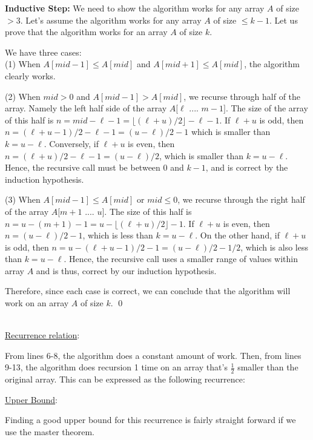 \documentclass[11pt]{article}
\begin{document}
\begin{enumerate}
{\bf Inductive Step:} We need to show the algorithm works for any array $A$ of size $> 3$. Let's assume the algorithm works for any array $A$ of size $\leq k-1$. Let us prove that the algorithm works for an array $A$ of size $k$.

We have three cases:\\
(1) When $A[mid-1] \leq A[mid]$ and $A[mid+1] \leq A[mid]$, the algorithm clearly works.

(2) When $mid > 0$ and $A[mid-1] > A[mid]$, we recurse through half of the array. Namely the left half side of the array $A[\ell$ .... $m-1]$. The size of the array of this half is $n = mid - \ell - 1 = \lfloor (\ell + u)/2 \rfloor - \ell - 1$. If $\ell + u$ is odd, then $n = (\ell + u - 1)/2 - \ell - 1 = (u - \ell)/2 -1$ which is smaller than $k=u -\ell$. Conversely, if $\ell + u$ is even, then $n=(\ell + u)/2 - \ell -1 = (u-\ell)/2$, which is smaller than $k=u-\ell$. Hence, the recursive call must be between $0$ and $k-1$, and is correct by the induction hypothesis.

(3) When $A[mid-1] \leq A[mid]$ or $mid \leq 0$, we recurse through the right half of the array $A[m+1$ .... $u]$. The size of this half is $n=u-(m+1)-1=u-\lfloor (\ell + u)/2 \rfloor - 1$. If $\ell + u$ is even, then $n=(u-\ell)/2-1$, which is less than $k=u-\ell$. On the other hand, if $\ell + u$ is odd, then $n=u-(\ell + u - 1)/2 -1=(u-\ell)/2 - 1/2$, which is also less than $k=u-\ell$. Hence, the recursive call uses a smaller range of values within array $A$ and is thus, correct by our induction hypothesis.

Therefore, since each case is correct, we can conclude that the algorithm will work on an array $A$ of size $k$.
\-\hspace{14.16cm}\qed\\ 
\- \

\underline{Recurrence relation}:

From lines 6-8, the algorithm does a constant amount of work. Then, from lines 9-13, the algorithm does recursion 1 time on an array that's $\frac{1}{2}$ smaller than the original array. This can be expressed as the following recurrence:
\begin{center}\end{center}

\underline{Upper Bound}:

Finding a good upper bound for this recurrence is fairly straight forward if we use the master theorem.


\end{enumerate}
\end{document}
